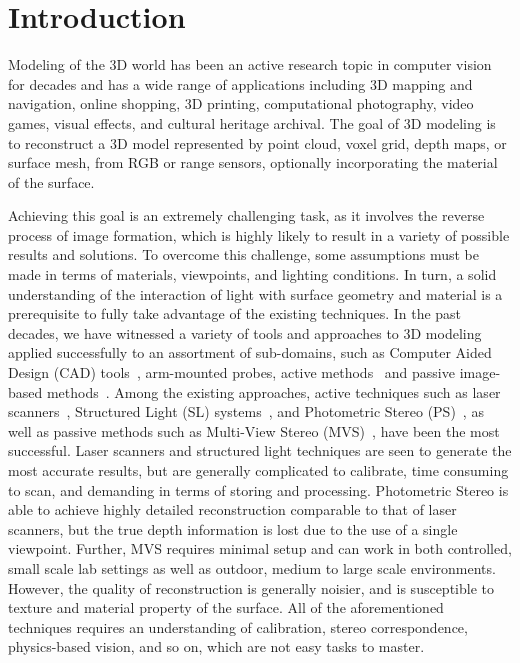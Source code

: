 
\chapter{Introduction}
\label{ch:Introduction}
Modeling of the 3D world has been an active research topic in computer vision for decades and has a wide range of applications including 3D mapping and navigation, online shopping, 3D printing, computational photography, video games, visual effects, and cultural heritage archival. The goal of 3D modeling is to reconstruct a 3D model represented by point cloud, voxel grid, depth maps, or surface mesh, from RGB or range sensors, optionally incorporating the material of the surface.

Achieving this goal is an extremely challenging task, as it involves the reverse process of image formation, which is highly likely to result in a variety of possible results and solutions. To overcome this challenge, some assumptions must be made in terms of materials, viewpoints, and lighting conditions. In turn, a solid understanding of the interaction of light with surface geometry and material is a prerequisite to fully take advantage of the existing techniques. In the past decades, we have witnessed a variety of tools and approaches to 3D modeling applied successfully to an assortment of sub-domains, such as Computer Aided Design (CAD) tools~\cite{CAD}, arm-mounted probes, active methods~\cite{bernardini2002building,levoy2000digital,Lidar,kinect} and passive image-based methods~\cite{kutulakos2000theory,furukawa2010accurate,faugeras2002variational,goesele2006multi}. Among the existing approaches, active techniques such as laser scanners~\cite{levoy2000digital}, Structured Light (SL) systems~\cite{bernardini2002building}, and Photometric Stereo (PS)~\cite{woodham1980photometric}, as well as passive methods such as Multi-View Stereo (MVS)~\cite{seitz2006comparison}, have been the most successful. Laser scanners and structured light techniques are seen to generate the most accurate results, but are generally complicated to calibrate, time consuming to scan, and demanding in terms of storing and processing. Photometric Stereo is able to achieve highly detailed reconstruction comparable to that of laser scanners, but the true depth information is lost due to the use of a single viewpoint. Further, MVS requires minimal setup and can work in both controlled, small scale lab settings as well as outdoor, medium to large scale environments. However, the quality of reconstruction is generally noisier, and is susceptible to texture and material property of the surface. All of the aforementioned techniques requires an understanding of calibration, stereo correspondence, physics-based vision, and so on, which are not easy tasks to master.

